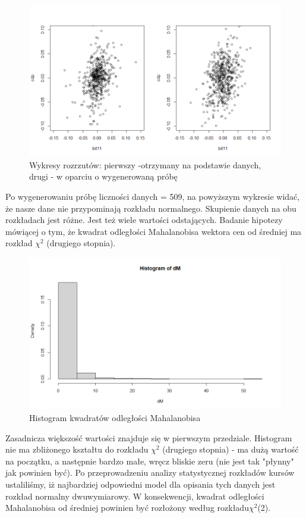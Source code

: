 \documentclass[a4paper,11pt]{article}
\def\\{\hfill\break}
\begin{document}
\begin{figure}[H]
    \includegraphics[width=12cm]{Wykresy/QQploty.png}
    \caption{Wykresy rozrzutów: pierwszy -otrzymany na podstawie danych, drugi - w oparciu o wygenerowaną próbę}
    \label{QQploty}
\end{figure}
Po wygenerowaniu próbę liczności danych = 509, na powyższym wykresie widać, że nasze dane nie przypominają rozkładu normalnego. Skupienie danych na obu rozkładach jest różne. Jest też wiele wartości odstających.
\\ \\
\newpage
Badanie hipotezy mówiącej o tym, że kwadrat odległości Mahalanobisa wektora cen od średniej ma rozkład $\chi^2$ (drugiego stopnia).
\begin{figure}[H]
    \includegraphics[width=12cm]{Wykresy/Histogram_Mahalanobis.png}
    \caption{Histogram kwadratów odległości Mahalanobisa}
    \label{Histogram_Mahalanobis}
\end{figure}
Zasadnicza większość wartości znajduje się w pierwszym przedziale. Histogram nie ma zbliżonego kształtu do rozkładu $\chi^2$ (drugiego stopnia) -  ma dużą wartość na początku, a następnie bardzo małe, wręcz bliskie zeru (nie jest tak "płynny" jak powinien być).
\\
\\
Po przeprowadzeniu analizy statystycznej rozkładów kursów ustaliliśmy, iż najbardziej odpowiedni model dla opisania tych danych jest rozkład normalny dwuwymiarowy. W konsekwencji, kwadrat odległości Mahalanobisa od średniej powinien być rozłożony według rozkładu$\chi^2$(2).
\end{document}
